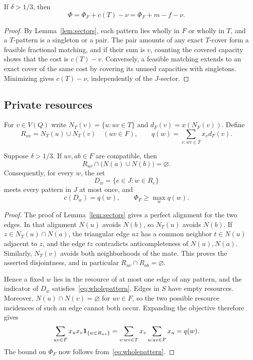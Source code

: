 \begin{proposition}\label{prop:decomposition}
If $\delta>1/3$, then
\begin{equation}\label{eq:decomposition}
 \Phi=\Phi_F+c(T)-\nu=\Phi_F+m-f-\nu.
\end{equation}
\end{proposition}
\begin{proof}
By Lemma~\ref{lem:sectors}, each pattern lies wholly in $F$ or wholly in $T$, and a $T$-pattern is a singleton or a pair. The pair amounts of any exact $T$-cover form a feasible fractional matching, and if their sum is $v$, counting the covered capacity shows that the cost is $c(T)-v$. Conversely, a feasible matching extends to an exact cover of the same cost by covering its unused capacities with singletons. Minimizing gives $c(T)-\nu$, independently of the $J$-sector.
\end{proof}

\subsection{Private resources}
For $v\in V(Q)$ write $N_T(v)=\{u:uv\in T\}$ and $d_F(v)=x(N_F(v))$. Define
\begin{equation}\label{eq:resources}
 R_{uv}=N_T(u)\cup N_T(v)\quad(uv\in F),\qquad
 q(w)=\sum_{v:wv\in T}x_vd_F(v).
\end{equation}

\begin{lemma}\label{lem:resources}
Suppose $\delta>1/3$. If $uv,ab\in F$ are compatible, then
\[
 R_{uv}\cap\bigl(N(a)\cup N(b)\bigr)=\varnothing.
\]
Consequently, for every $w$, the set
\[
 D_w=\{e\in J:w\in R_e\}
\]
meets every pattern in $J$ at most once, and
\begin{equation}\label{eq:resourcebound}
 c(D_w)=q(w),\qquad \Phi_F\ge\max_wq(w).
\end{equation}
\end{lemma}
\begin{proof}
The proof of Lemma~\ref{lem:sectors} gives a perfect alignment for the two edges. In that alignment $N(u)$ avoids $N(b)$, so $N_T(u)$ avoids $N(b)$. If $z\in N_T(u)\cap N(a)$, the triangular edge $uz$ has a common neighbor $t\in N(u)$ adjacent to $z$, and the edge $tz$ contradicts anticompleteness of $N(u),N(a)$. Similarly, $N_T(v)$ avoids both neighborhoods of the mate. This proves the asserted disjointness, and in particular $R_{uv}\cap R_{ab}=\varnothing$.

Hence a fixed $w$ lies in the resource of at most one edge of any pattern, and the indicator of $D_w$ satisfies~\eqref{eq:wholepattern}. Edges in $S$ have empty resources. Moreover, $N(u)\cap N(v)=\varnothing$ for $uv\in F$, so the two possible resource incidences of such an edge cannot both occur. Expanding the objective therefore gives
\[
 \sum_{uv\in F}x_ux_v\mathbf 1_{\{w\in R_{uv}\}}
 =\sum_{v:wv\in T}x_v\sum_{u:uv\in F}x_u=q(w).
\]
The bound on $\Phi_F$ now follows from~\eqref{eq:wholepattern}.
\end{proof}

